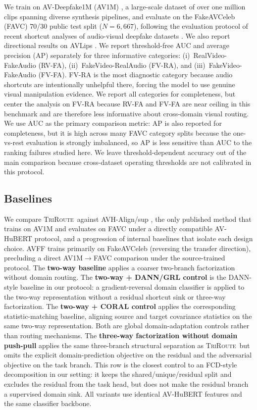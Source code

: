 \documentclass{article}
\newcommand{\method}{\textsc{TriRoute}}
\begin{document}
We train on AV-Deepfake1M (AV1M) \citep{cai2024avdeepfake1m}, a large-scale dataset of over one million clips spanning diverse synthesis pipelines, and evaluate on the FakeAVCeleb (FAVC) \citep{khalid2021fakeavceleb} 70/30 public test split ($N=6{,}667$), following the evaluation protocol of recent shortcut analyses of audio-visual deepfake datasets \citep{smeu2025avhalign}. We also report directional results on AVLips \citep{como2024lips}. We report threshold-free AUC and average precision (AP) separately for three informative categories: (i)~RealVideo-FakeAudio (RV-FA), (ii)~FakeVideo-RealAudio (FV-RA), and (iii)~FakeVideo-FakeAudio (FV-FA). FV-RA is the most diagnostic category because audio shortcuts are intentionally unhelpful there, forcing the model to use genuine visual manipulation evidence. We report all categories for completeness, but center the analysis on FV-RA because RV-FA and FV-FA are near ceiling in this benchmark and are therefore less informative about cross-domain visual routing. We use AUC as the primary comparison metric: AP is also reported for completeness, but it is high across many FAVC category splits because the one-vs-rest evaluation is strongly imbalanced, so AP is less sensitive than AUC to the ranking failures studied here. We leave threshold-dependent accuracy out of the main comparison because cross-dataset operating thresholds are not calibrated in this protocol.

\subsection{Baselines}

We compare \method\ against AVH-Align/sup \citep{smeu2025avhalign}, the only published method that trains on AV1M and evaluates on FAVC under a directly compatible AV-HuBERT protocol, and a progression of internal baselines that isolate each design choice. AVFF \citep{oorloff2024avff} trains primarily on FakeAVCeleb (reversing the transfer direction), precluding a direct AV1M$\to$FAVC comparison under the source-trained protocol. The \textbf{two-way baseline} applies a coarser two-branch factorization without domain routing. The \textbf{two-way + DANN/GRL control} is the DANN-style baseline in our protocol: a gradient-reversal domain classifier is applied to the two-way representation without a residual shortcut sink or three-way factorization. The \textbf{two-way + CORAL control} applies the corresponding statistic-matching baseline, aligning source and target covariance statistics on the same two-way representation. Both are global domain-adaptation controls rather than routing mechanisms. The \textbf{three-way factorization without domain push-pull} applies the same three-branch structural separation as \method\ but omits the explicit domain-prediction objective on the residual and the adversarial objective on the task branch. This row is the closest control to an FCD-style decomposition in our setting: it keeps the shared/unique/residual split and excludes the residual from the task head, but does not make the residual branch a supervised domain sink. All variants use identical AV-HuBERT features and the same classifier backbone.
\end{document}
